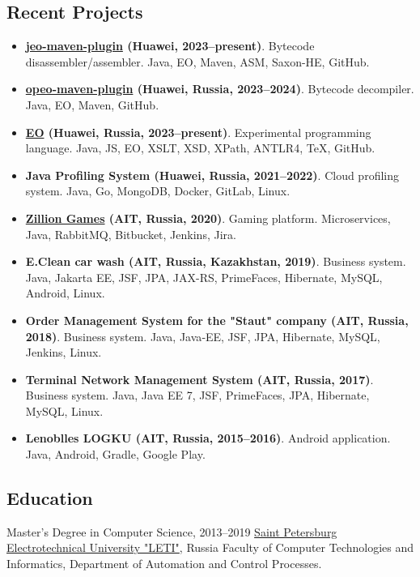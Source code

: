 \documentclass{vl}
\begin{document}
    \subsection*{Recent Projects}

    \begin{itemize}
        \itemsep0em
        \item \textbf{\href{https://github.com/objectionary/jeo-maven-plugin}{jeo-maven-plugin} (Huawei, 2023--present)}. Bytecode disassembler/assembler. Java, EO, Maven, ASM, Saxon-HE, GitHub.
        \item \textbf{\href{https://github.com/objectionary/opeo-maven-plugin}{opeo-maven-plugin} (Huawei, Russia, 2023--2024)}. Bytecode decompiler. Java, EO, Maven, GitHub.
        \item \textbf{\href{https://www.eolang.org}{EO} (Huawei, Russia, 2023--present)}. Experimental programming language. Java, JS, EO, XSLT, XSD, XPath, ANTLR4, TeX, GitHub.
        \item \textbf{Java Profiling System (Huawei, Russia, 2021--2022)}. Cloud profiling system. Java, Go, MongoDB, Docker, GitLab, Linux.
        \item \textbf{\href{http://zillion.games/}{Zillion Games} (AIT, Russia, 2020)}. Gaming platform. Microservices, Java, RabbitMQ, Bitbucket, Jenkins, Jira.
        \item \textbf{E.Clean car wash (AIT, Russia, Kazakhstan, 2019)}. Business system. Java, Jakarta EE, JSF, JPA, JAX-RS, PrimeFaces, Hibernate, MySQL, Android, Linux. 
        \item \textbf{Order Management System for the "Staut" company (AIT, Russia, 2018)}. Business system. Java, Java‐EE, JSF, JPA, Hibernate, MySQL, Jenkins, Linux.
        \item \textbf{Terminal Network Management System (AIT, Russia, 2017)}. Business system. Java, Java EE 7, JSF, PrimeFaces, JPA, Hibernate, MySQL, Linux.
        \item \textbf{Lenoblles LOGKU (AIT, Russia, 2015--2016)}. Android application. Java, Android, Gradle, Google Play.
    \end{itemize}

    \subsection*{Education}
    \begin{samepage}
        Master's Degree in Computer Science, 2013--2019\newline
        \href{https://etu.ru/en/university/}{Saint Petersburg Electrotechnical University "LETI"}, Russia\newline
        Faculty of Computer Technologies and Informatics, Department of Automation and Control Processes.
    \end{samepage}
\end{document}
